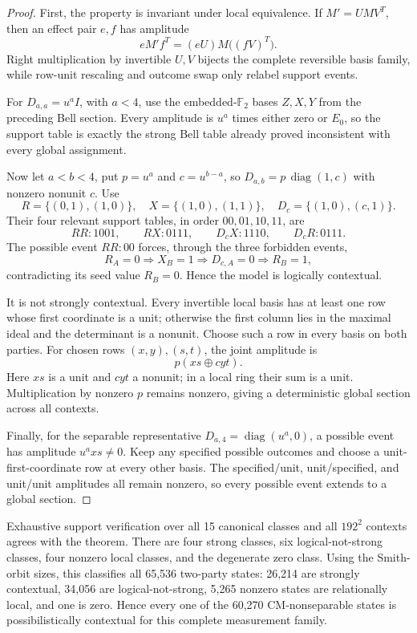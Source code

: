 \documentclass[11pt]{article}
\newcommand{\F}{\mathbb F}
\newcommand{\xorp}{\mathbin{\oplus}}
\begin{document}
\begin{proof}
First, the property is invariant under local equivalence.  If
$M'=UMV^T$, then an effect pair $e,f$ has amplitude
\[
eM'f^{T}=(eU)M\bigl((fV)^{T}\bigr).
\]
Right multiplication by invertible $U,V$ bijects the complete reversible
basis family, while row-unit rescaling and outcome swap only relabel support
events.

For $D_{a,a}=u^a I$, with $a<4$, use the embedded-$\F_2$ bases $Z,X,Y$
from the preceding Bell section.  Every amplitude is $u^a$ times either zero
or $E_0$, so the support table is exactly the strong Bell table already
proved inconsistent with every global assignment.

Now let $a<b<4$, put $p=u^a$ and $c=u^{b-a}$, so
$D_{a,b}=p\,\operatorname{diag}(1,c)$ with nonzero nonunit $c$.  Use
\[
R=\{(0,1),(1,0)\},\quad
X=\{(1,0),(1,1)\},\quad
D_c=\{(1,0),(c,1)\}.
\]
Their four relevant support tables, in order $00,01,10,11$, are
\[
RR:1001,\qquad RX:0111,\qquad D_c X:1110,\qquad D_c R:0111.
\]
The possible event $RR:00$ forces, through the three forbidden events,
\[
R_A=0\Rightarrow X_B=1\Rightarrow D_{c,A}=0\Rightarrow R_B=1,
\]
contradicting its seed value $R_B=0$.  Hence the model is logically
contextual.

It is not strongly contextual.  Every invertible local basis has at least one
row whose first coordinate is a unit; otherwise the first column lies in the
maximal ideal and the determinant is a nonunit.  Choose such a row in every
basis on both parties.  For chosen rows $(x,y),(s,t)$, the joint amplitude is
\[
p(xs\xorp cyt).
\]
Here $xs$ is a unit and $cyt$ a nonunit; in a local ring their sum is a unit.
Multiplication by nonzero $p$ remains nonzero, giving a deterministic global
section across all contexts.

Finally, for the separable representative $D_{a,4}=\operatorname{diag}(u^a,0)$,
a possible event has amplitude $u^a xs\neq0$.  Keep any specified possible
outcomes and choose a unit-first-coordinate row at every other basis.  The
specified/unit, unit/specified, and unit/unit amplitudes all remain nonzero,
so every possible event extends to a global section.
\end{proof}

Exhaustive support verification over all 15 canonical classes and all
$192^2$ contexts agrees with the theorem.  There are four strong classes, six
logical-not-strong classes, four nonzero local classes, and the degenerate zero
class.  Using the Smith-orbit sizes, this classifies all 65,536 two-party
states: 26,214 are strongly contextual, 34,056 are logical-not-strong, 5,265
nonzero states are relationally local, and one is zero.  Hence every one of
the 60,270 CM-nonseparable states is possibilistically contextual for this
complete measurement family.
\end{document}
